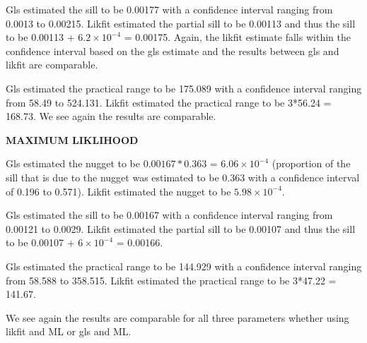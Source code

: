 \documentclass{article}\usepackage[]{graphicx}\usepackage[]{color}
\begin{document}
\begin{enumerate}
Gls estimated the sill to be 0.00177 with a confidence interval ranging from 0.0013 to 0.00215. Likfit estimated the partial sill to be 0.00113 and thus the sill to be 0.00113 +  \ensuremath{6.2\times 10^{-4}} = 0.00175. Again, the likfit estimate falls within the confidence interval based on the gls estimate and the results between gls and likfit are comparable.

Gls estimated the practical range to be 175.089 with a confidence interval ranging from 58.49 to 524.131. Likfit estimated the practical range to be 3*56.24 = 168.73. We see again the results are comparable. 



{\bf MAXIMUM LIKLIHOOD}

Gls estimated the nugget to be $0.00167*0.363$ = \ensuremath{6.06\times 10^{-4}} (proportion of the sill that is due to the nugget was estimated to be 0.363 with a confidence interval of 0.196 to 0.571). Likfit estimated the nugget to be \ensuremath{5.98\times 10^{-4}}.

Gls estimated the sill to be 0.00167 with a confidence interval ranging from 0.00121 to 0.0029. Likfit estimated the partial sill to be 0.00107 and thus the sill to be 0.00107 +  \ensuremath{6\times 10^{-4}} = 0.00166. 

Gls estimated the practical range to be 144.929 with a confidence interval ranging from 58.588 to 358.515. Likfit estimated the practical range to be 3*47.22 = 141.67. 


We see again the results are comparable for all three parameters whether using likfit and ML or gls and ML.


\end{enumerate}
\end{document}
